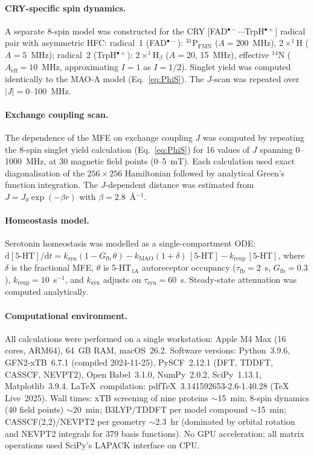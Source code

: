 \documentclass[11pt]{article}
\begin{document}
\paragraph{CRY-specific spin dynamics.}
A separate 8-spin model was constructed for the CRY [FAD$^{\bullet-}$$\cdots$TrpH$^{\bullet+}$] radical pair with asymmetric HFC: radical~1 (FAD$^{\bullet-}$): $^{31}$P$_\mathrm{FMN}$ ($A = 200$~MHz), 2$\times^1$H ($A = 5$~MHz); radical~2 (TrpH$^{\bullet+}$): 2$\times^1$H$_\beta$ ($A = 20$, 15~MHz), effective $^{14}$N ($A_\mathrm{eff} = 10$~MHz, approximating $I = 1$ as $I = 1/2$). Singlet yield was computed identically to the MAO-A model (Eq.~\ref{eq:PhiS}). The $J$-scan was repeated over $|J| = 0$--100~MHz.

\paragraph{Exchange coupling scan.}
The dependence of the MFE on exchange coupling $J$ was computed by repeating the 8-spin singlet yield calculation (Eq.~\ref{eq:PhiS}) for 16 values of $J$ spanning 0--1000~MHz, at 30 magnetic field points (0--5~mT). Each calculation used exact diagonalisation of the $256 \times 256$ Hamiltonian followed by analytical Green's function integration. The $J$-dependent distance was estimated from $J = J_0\exp(-\beta r)$ with $\beta = 2.8$~\AA$^{-1}$\cite{Steiner1989}.

\paragraph{Homeostasis model.}
Serotonin homeostasis was modelled as a single-compartment ODE: $\mathrm{d}[\text{5-HT}]/\mathrm{d}t = k_\mathrm{syn}(1 - G_\mathrm{fb}\,\theta) - k_\mathrm{MAO}(1+\delta)\,[\text{5-HT}] - k_\mathrm{reup}\,[\text{5-HT}]$, where $\delta$ is the fractional MFE, $\theta$ is 5-HT$_{1\mathrm{A}}$ autoreceptor occupancy ($\tau_\mathrm{fb} = 2$~s, $G_\mathrm{fb} = 0.3$), $k_\mathrm{reup} = 10$~s$^{-1}$, and $k_\mathrm{syn}$ adjusts on $\tau_\mathrm{syn} = 60$~s. Steady-state attenuation was computed analytically.

\paragraph{Computational environment.}
All calculations were performed on a single workstation: Apple M4 Max (16 cores, ARM64), 64~GB RAM, macOS~26.2. Software versions: Python~3.9.6, GFN2-xTB~6.7.1 (compiled 2024-11-25)\cite{Bannwarth2019}, PySCF~2.12.1\cite{Sun2020} (DFT, TDDFT, CASSCF, NEVPT2), Open Babel~3.1.0, NumPy~2.0.2, SciPy~1.13.1, Matplotlib~3.9.4. \LaTeX\ compilation: pdf\TeX~3.141592653-2.6-1.40.28 (TeX Live~2025). Wall times: xTB screening of nine proteins $\sim$15~min; 8-spin dynamics (40 field points) $\sim$20~min; B3LYP/TDDFT per model compound $\sim$15~min; CASSCF(2,2)/NEVPT2 per geometry $\sim$2.3~hr (dominated by orbital rotation and NEVPT2 integrals for 379 basis functions). No GPU acceleration; all matrix operations used SciPy's LAPACK interface on CPU.
\end{document}
